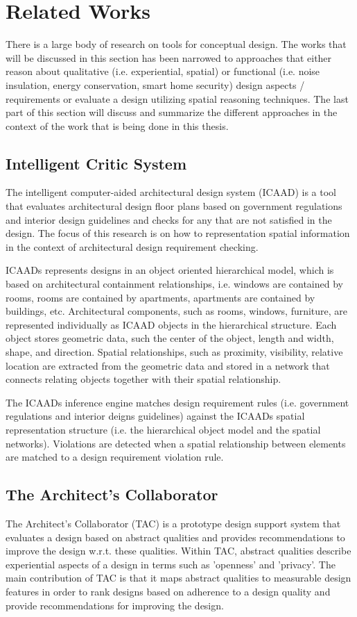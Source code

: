 \documentclass[12pt]{ucthesis}
\begin{document}
\section{Related Works}
\label{related works}
There is a large body of research on tools for conceptual design. The works that will be discussed in this section has been narrowed to approaches that either reason about qualitative (i.e. experiential, spatial) or functional (i.e. noise insulation, energy conservation, smart home security) design aspects / requirements or evaluate a design utilizing spatial reasoning techniques. The last part of this section will discuss and summarize the different approaches in the context of the work that is being done in this thesis.


\subsection{Intelligent Critic System}
The intelligent computer-aided architectural design system (ICAAD) \cite{IntelligentCritic} is a tool that evaluates architectural design floor plans based on government regulations and interior design guidelines and checks for any that are not satisfied in the design. The focus of this research is on how to representation spatial information in the context of architectural design requirement checking.

ICAADs represents designs in an object oriented hierarchical model, which is based on architectural containment relationships, i.e. windows are contained by rooms, rooms are contained by apartments, apartments are contained by buildings, etc. Architectural components, such as rooms, windows, furniture, are represented individually as ICAAD objects in the hierarchical structure. Each object stores geometric data, such the center of the object, length and width, shape, and direction. Spatial relationships, such as proximity, visibility, relative location are extracted from the geometric data and stored in a network that connects relating objects together with their spatial relationship. 

The ICAADs inference engine matches design requirement rules (i.e. government regulations and interior deigns guidelines) against the ICAADs spatial representation structure (i.e. the hierarchical object model and the spatial networks). Violations are detected when a spatial relationship between elements are matched to a design requirement violation rule.  


\subsection{The Architect's Collaborator}
The Architect's Collaborator (TAC) \cite{KoileTAC} is a prototype design support system that evaluates a design based on abstract qualities and provides recommendations to improve the design w.r.t. these qualities. Within TAC, abstract qualities describe experiential aspects of a design in terms such as 'openness' and 'privacy'. The main contribution of TAC is that it maps abstract qualities to measurable design features in order to rank designs based on adherence to a design quality and provide recommendations for improving the design. 
\end{document}
